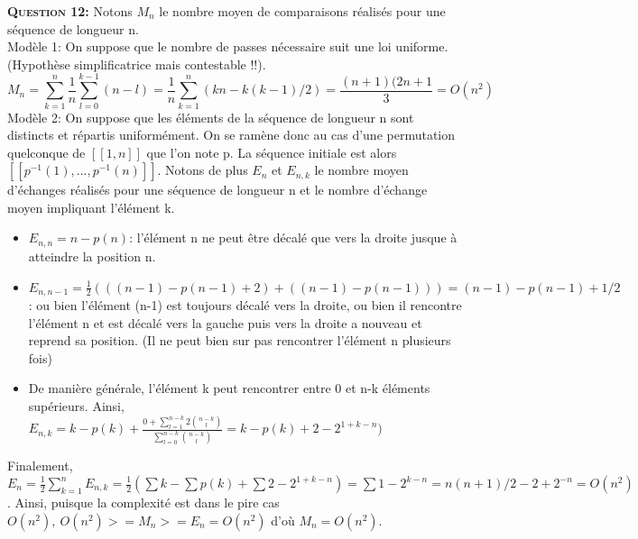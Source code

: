 \documentclass{article}
\begin{document}
\textsc{\bfseries Question 12:}
Notons \(M_{n}\) le nombre moyen de comparaisons réalisés pour une séquence de longueur n.\\
Modèle 1: On suppose que le nombre de passes nécessaire suit une loi uniforme. (Hypothèse simplificatrice mais contestable !!). \[M_{n}=\sum_{k=1}^{n}\frac{1}{n}\sum_{l=0}^{k-1}(n-l)=\frac{1}{n}\sum_{k=1}^{n}(kn-k(k-1)/2)=\frac{(n+1)(2n+1}{3}=O(n^{2})\]
Modèle 2: On suppose que les éléments de la séquence de longueur n sont distincts et répartis uniformément. On se ramène donc au cas d'une permutation quelconque de \([\![1,n]\!]\) que l'on note p. La séquence initiale est alors \([\![p^{-1}(1),...,p^{-1}(n)]\!]\). Notons de plus \(E_{n}\) et \(E_{n,k}\) le nombre moyen d'échanges réalisés pour une séquence de longueur n et le nombre d'échange moyen impliquant l'élément k.
\begin{itemize}
	\item \(E_{n,n}= n-p(n)\): l'élément n ne peut être décalé que vers la droite jusque à atteindre la position n.
	\item \(E_{n,n-1}= \frac{1}{2}(((n-1)-p(n-1)+2) + ((n-1)-p(n-1)))=(n-1)-p(n-1)+1/2\): ou bien l'élément (n-1) est toujours décalé vers la droite, ou bien il rencontre l'élément n et est décalé vers la gauche puis vers la droite a nouveau et reprend sa position. (Il ne peut bien sur pas rencontrer l'élément n plusieurs fois)      
	\item De manière générale, l'élément k peut rencontrer entre 0 et n-k éléments supérieurs. Ainsi, \(E_{n,k}= k-p(k)+\frac{0+\sum_{l=1}^{n-k}2{n-k\choose l}}{\sum_{l=0}^{n-k}{n-k\choose l}}=k-p(k)+2-2^{1+k-n})\) 		
\end{itemize}

Finalement, \(E_{n}=\frac{1}{2}\sum_{k=1}^{n}E_{n,k}=\frac{1}{2}(\sum k-\sum p(k)+\sum 2-2^{1+k-n})=\sum 1-2^{k-n}=n(n+1)/2-2+2^{-n}=O(n^{2})\).
Ainsi, puisque la complexité est dans le pire cas \(O(n^{2}),\  O(n^{2})>=M_{n}>=E_{n}=O(n^{2})\) d'où \(M_{n}=O(n^{2})\).\\
\end{document}
